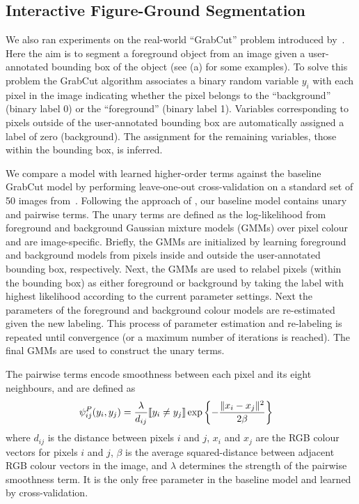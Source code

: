 \documentclass[10pt,journal,letterpaper,compsoc]{IEEEtran}
\renewcommand{\citename}{\citet}
\begin{document}
\subsection{Interactive Figure-Ground Segmentation}

We also ran experiments on the real-world ``GrabCut'' problem
introduced by~\citename{Rother:SIGGRAPH04}. Here the aim is to segment
a foreground object from an image given a user-annotated bounding box
of the object (see (a) for some
examples). To solve this problem the GrabCut algorithm associates a
binary random variable $y_i$ with each pixel in the image indicating
whether the pixel belongs to the ``background'' (binary label 0) or
the ``foreground'' (binary label 1). Variables corresponding to pixels
outside of the user-annotated bounding box are automatically assigned
a label of zero (\ie background). The assignment for the remaining
variables, \ie those within the bounding box, is inferred.

We compare a model with learned higher-order terms against the
baseline GrabCut model by performing leave-one-out cross-validation on
a standard set of 50 images
from~\citename{Lempitsky:ICCV09}. Following the approach of
\citename{Rother:SIGGRAPH04}, our baseline model contains unary and
pairwise terms. The unary terms are defined as the log-likelihood from
foreground and background Gaussian mixture models (GMMs) over pixel
colour and are image-specific. Briefly, the GMMs are initialized by
learning foreground and background models from pixels inside and
outside the user-annotated bounding box, respectively. Next, the GMMs
are used to relabel pixels (within the bounding box) as either
foreground or background by taking the label with highest likelihood
according to the current parameter settings. Next the parameters of
the foreground and background colour models are re-estimated given the
new labeling. This process of parameter estimation and re-labeling is
repeated until convergence (or a maximum number of iterations is
reached). The final GMMs are used to construct the unary terms.

The pairwise terms encode smoothness between each pixel and its eight
neighbours, and are defined as
%
\begin{align}
  \psi^P_{ij}(y_i, y_j) &= \frac{\lambda}{d_{ij}} \ind{y_i \neq y_j} \exp\left\{- \frac{\|x_i - x_j\|^2}{2 \beta}\right\}
\end{align}
%
where $d_{ij}$ is the distance between pixels $i$ and $j$, $x_i$ and
$x_j$ are the RGB colour vectors for pixels $i$ and $j$, $\beta$ is
the average squared-distance between adjacent RGB colour vectors in
the image, and $\lambda$ determines the strength of the pairwise
smoothness term. It is the only free parameter in the baseline model
and learned by cross-validation.
\end{document}
